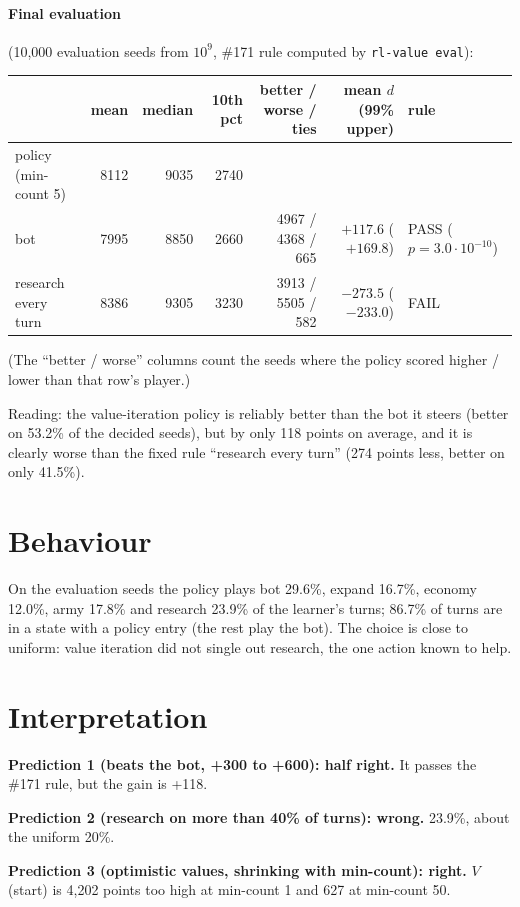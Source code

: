 \documentclass{../polyexp}
\begin{document}
\paragraph{Final evaluation} (10{,}000 evaluation seeds from $10^9$, \#171 rule computed by \texttt{rl-value eval}):

\begin{center}\small
\begin{tabular}{lrrrrrl}
\toprule
 & mean & median & 10th pct & better / worse / ties & mean $d$ (99\% upper) & rule \\
\midrule
policy (min-count 5)      & 8112 & 9035 & 2740 & & & \\
bot                       & 7995 & 8850 & 2660 & 4967 / 4368 / 665 & $+117.6$ ($+169.8$) & PASS ($p = 3.0\cdot10^{-10}$) \\
research every turn       & 8386 & 9305 & 3230 & 3913 / 5505 / 582 & $-273.5$ ($-233.0$) & FAIL \\
\bottomrule
\end{tabular}
\end{center}
(The ``better / worse'' columns count the seeds where the policy scored higher / lower than that row's player.)

Reading: the value-iteration policy is reliably better than the bot it steers (better on 53.2\% of the decided
seeds), but by only 118 points on average, and it is clearly worse than the fixed rule ``research every turn''
(274 points less, better on only 41.5\%).

\section{Behaviour}
On the evaluation seeds the policy plays bot 29.6\%, expand 16.7\%, economy 12.0\%, army 17.8\% and research 23.9\%
of the learner's turns; 86.7\% of turns are in a state with a policy entry (the rest play the bot). The choice is
close to uniform: value iteration did not single out research, the one action known to help.

\section{Interpretation}
\textbf{Prediction 1 (beats the bot, +300 to +600): half right.} It passes the \#171 rule, but the gain is +118.

\textbf{Prediction 2 (research on more than 40\% of turns): wrong.} 23.9\%, about the uniform 20\%.

\textbf{Prediction 3 (optimistic values, shrinking with min-count): right.} $V$(start) is 4{,}202 points too high at
min-count 1 and 627 at min-count 50.
\end{document}
